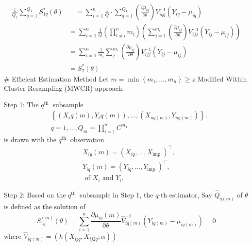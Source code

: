 \documentclass[UTF8,a4paper,10pt]{article}
\begin{document}
$$
\begin{aligned}
    \frac{1}{Q_1} \sum_{q=1}^{Q_1} S_{1q}^*(\theta)& \quad=\sum_{i=1}^n \frac{1}{Q} \cdot \sum_{q=1}^{Q_1}\left(\frac{\partial \mu_{i q}}{\partial \theta}\right) V_{i q q}^{-1}\left(Y_{i q}-\mu_{i q}\right) \\
& =\sum_{i=1}^n \frac{1}{Q}\left(\prod_{l \neq i}^n m_l\right)\left(\sum_{j=1}^{m_i}\left(\frac{\partial \mu_{i j}}{\partial \theta}\right) V_{i j j}^{-1}\left(Y_{i j}-\mu_{i j}\right)\right) \\
& =\sum_{i=1}^n \frac{1}{m_i} \sum_j^{m_i}\left(\frac{\partial \mu_{i j}}{\partial \theta}\right) V_{i j j}^{-1}\left(Y_{i j}-\mu_{i j}\right) \\
& =S_2^*(\theta)
\end{aligned}
$$
\# Efficient Estimation Method Let $m=\min \left\{m_1, \ldots, m_n\right\} \geq z$
Modified Within Cluster Resampling (MWCR) approach.

Step 1: The $q^{\text {th }}$ subsample
$$
\begin{aligned}
& \left\{\left(X_i q(m), Y_i q(m)\right), \ldots,\left(X_{n q(m)}, Y_{n q(m)}\right)\right\} . \\
& q=1, \ldots, Q_m=\prod_{i=1}^n C^{m_1}
\end{aligned}
$$
is drawn with the $q^{\text {th }}$ observation
$$
\begin{aligned}
& X_{i g}(m)=\left(X_{i q}, \ldots, X_{\text {imp }}\right)^{\top}, \\
& Y_{i q}(m)=\left(Y_{i q}, \ldots, Y_{\text {imp }}\right)^{\top}, \\
& \text { of } X_i \text { and } Y_i .
\end{aligned}
$$

Step 2: Based on the $q^{\text {th }}$ subsample in Step 1, the \(q\)-th estimator, Say $\hat{Q}_{q(m)}$ of $\theta$ is defined as the solution of
$$
S_{1 q}^{(m)}(\theta)=\sum_{i=1}^n \frac{\partial \mu_{i q}(m)}{\partial \theta} \hat{V}_{i q(m)}^{-1}\left(Y_{i q(m)}-\mu_{i q(m)}\right)=0
$$
where $\hat{V}_{i q(m)}=\left(h\left(X_{i j q}, X_{i j 2 q} ; \alpha\right)\right)$
\end{document}
